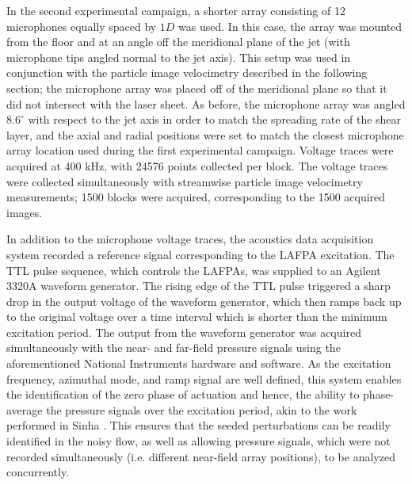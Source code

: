 In the second experimental campaign, a shorter array consisting of 12 microphones equally spaced by $1D$ was used. 
In this case, the array was mounted from the floor and at an angle off the meridional plane of the jet (with microphone tips angled normal to the jet axis).
This setup was used in conjunction with the particle image velocimetry described in the following section; the microphone array was placed off of the meridional plane so that it did not intersect with the laser sheet. 
As before, the microphone array was angled $8.6^\circ$ with respect to the jet axis in order to match the spreading rate of the shear layer, and the axial and radial positions were set to match the closest microphone array location used during the first experimental campaign.
Voltage traces were acquired at 400 kHz, with 24576 points collected per block.
The voltage traces were collected simultaneously with streamwise particle image velocimetry measurements; 1500 blocks were acquired, corresponding to the 1500 acquired images.

In addition to the microphone voltage traces, the acoustics data acquisition system recorded a reference signal corresponding to the LAFPA excitation. 
The TTL pulse sequence, which controls the LAFPAs, was supplied to an Agilent 3320A waveform generator. 
The rising edge of the TTL pulse triggered a sharp drop in the output voltage of the waveform generator, which then ramps back up to the original voltage over a time interval which is shorter than the minimum excitation period. 
The output from the waveform generator was acquired simultaneously with the near- and far-field pressure signals using the aforementioned National Instruments hardware and software. 
As the excitation frequency, azimuthal mode, and ramp signal are well defined, this system enables the identification of the zero phase of actuation and hence, the ability to phase-average the pressure signals over the excitation period, akin to the work performed in Sinha \etal \citep{Sinha2012}.
This ensures that the seeded perturbations can be readily identified in the noisy flow, as well as allowing pressure signals, which were not recorded simultaneously (i.e. different near-field array positions), to be analyzed concurrently. 

